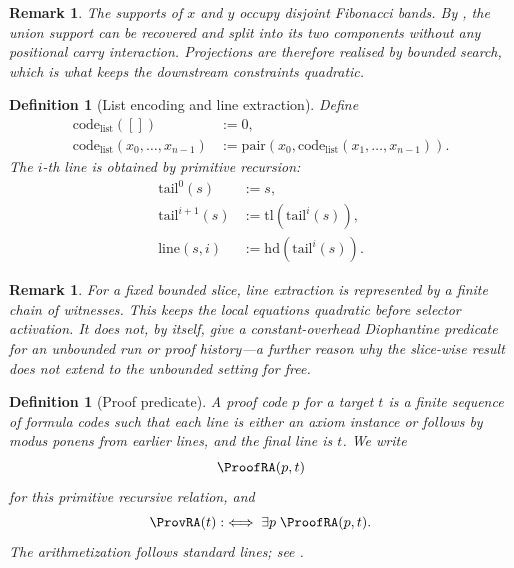 \documentclass[letterpaper,10pt]{article}
\theoremstyle{upright}
\theoremstyle{upright}
\newtheorem{remark}[theorem]{Remark}
\newtheorem{definition}[theorem]{Definition}
\begin{document}
\begin{remark}
	The supports of $x$ and $y$ occupy disjoint Fibonacci bands. By \citet{zeckendorf}, the union support can be recovered and split into its two components without any positional carry interaction. Projections are therefore realised by bounded search, which is what keeps the downstream constraints quadratic.
\end{remark}

\begin{definition}[List encoding and line extraction]
\label{def:list-code}
	Define
	\begin{align}
		\mathrm{code}_{\mathrm{list}}([])&:=0,\\
		\mathrm{code}_{\mathrm{list}}(x_0,\ldots,x_{n-1})&:=\mathrm{pair}(x_0,\mathrm{code}_{\mathrm{list}}(x_1,\ldots,x_{n-1})).
	\end{align}
	The $i$-th line is obtained by primitive recursion:
	\begin{align}
		\mathrm{tail}^0(s)&:=s,\\
		\mathrm{tail}^{i+1}(s)&:=\mathrm{tl}(\mathrm{tail}^i(s)),\\
		\mathrm{line}(s,i)&:=\mathrm{hd}(\mathrm{tail}^i(s)).
	\end{align}
\end{definition}

\begin{remark}
	For a fixed bounded slice, line extraction is represented by a finite chain of witnesses. This keeps the local equations quadratic before selector activation. It does not, by itself, give a constant-overhead Diophantine predicate for an unbounded run or proof history---a further reason why the slice-wise result does not extend to the unbounded setting for free.
\end{remark}

\begin{definition}[Proof predicate]
\label{def:proof-predicate}
	A proof code $p$ for a target $t$ is a finite sequence of formula codes such that each line is either an axiom instance or follows by modus ponens from earlier lines, and the final line is $t$. We write
	\begin{equation}
		\ProofRA(p,t)
	\end{equation}
	for this primitive recursive relation, and
	\begin{equation}
		\ProvRA(t):\iff\exists p\;\ProofRA(p,t).
	\end{equation}
	The arithmetization follows standard lines; see \citet{hajekpudlak93,kleene52,feferman60}.
\end{definition}
\end{document}
